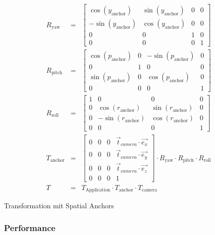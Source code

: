     \begin{floatingequation}[ht!]
        \begin{align}
            R_{\text{yaw}} &=&
            \begin{bmatrix}
                \cos(y_{\text{anchor}})  & \sin(y_{\text{anchor}}) & 0 & 0 \\
                -\sin(y_{\text{anchor}}) & \cos(y_{\text{anchor}}) & 0 & 0 \\
                0                        & 0                       & 1 & 0 \\
                0                        & 0                       & 0 & 1
            \end{bmatrix}\\
            R_{\text{pitch}} &=&
            \begin{bmatrix}
                \cos(p_{\text{anchor}}) & 0 & -\sin(p_{\text{anchor}}) & 0 \\
                0                       & 1 & 0                        & 0 \\
                \sin(p_{\text{anchor}}) & 0 & \cos(p_{\text{anchor}})  & 0 \\
                0                       & 0 & 0                        & 1
            \end{bmatrix}\\
            R_{\text{roll}} &=&
            \begin{bmatrix}
                1 & 0                        & 0                       & 0 \\
                0 & \cos(r_{\text{anchor}})  & \sin(r_{\text{anchor}}) & 0 \\
                0 & -\sin(r_{\text{anchor}}) & \cos(r_{\text{anchor}}) & 0 \\
                0 & 0                        & 0                       & 1
            \end{bmatrix}\\
            T_{\text{anchor}} &=&
            \begin{bmatrix}
                0 & 0 & 0 & \vec{t}_{camera}\cdot\vec{e_x} \\
                0 & 0 & 0 & \vec{t}_{camera}\cdot\vec{e_y} \\
                0 & 0 & 0 & \vec{t}_{camera}\cdot\vec{e_z} \\
                0 & 0 & 0 & 1
            \end{bmatrix}
            \cdot R_{\text{yaw}}\cdot R_{\text{pitch}}\cdot R_{\text{roll}}\\
            T &=& T_{\text{Application}}\cdot T_{\text{anchor}}\cdot T_{\text{camera}}
        \end{align}
        \caption{Transformation mit Spatial Anchors}
        \label{eq:spatial-camera-transformation}
    \end{floatingequation}

    \subsubsection{Performance}

